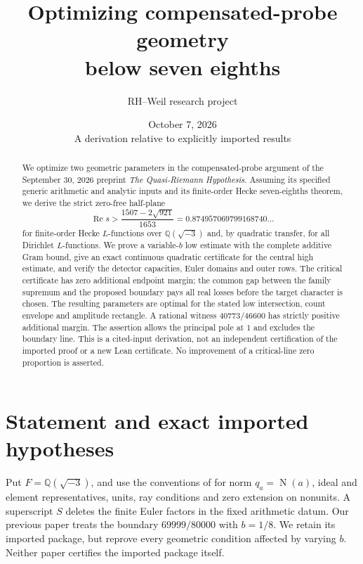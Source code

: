 \documentclass[11pt,a4paper]{article}
\title{Optimizing compensated-probe geometry\\below seven eighths}
\author{RH--Weil research project}
\date{October 7, 2026\\[3pt]\small A derivation relative to explicitly imported results}
\theoremstyle{definition}
\newcommand{\Rea}{\operatorname{Re}}
\newcommand{\N}{\operatorname{N}}
\begin{document}
\maketitle
\begin{abstract}
We optimize two geometric parameters in the compensated-probe argument
of the September 30, 2026 preprint \emph{The Quasi-Riemann Hypothesis}.
Assuming its specified generic arithmetic and analytic inputs and its
finite-order Hecke seven-eighths theorem, we derive the strict zero-free
half-plane
\[
 \Rea s>\frac{1507-2\sqrt{921}}{1653}
       =0.874957069799168740\ldots
\]
for finite-order Hecke $L$-functions over $\mathbb Q(\sqrt{-3})$
and, by quadratic transfer, for all Dirichlet $L$-functions.
We prove a variable-$b$ low estimate with the complete additive Gram
bound, give an exact continuous quadratic certificate for the central
high estimate, and verify the detector capacities, Euler domains and
outer rows. The critical certificate has zero additional endpoint
margin; the common gap between the family supremum and the proposed
boundary pays all real losses before the target character is chosen.
The resulting parameters are optimal for the stated low intersection,
count envelope and amplitude rectangle. A rational witness
$40773/46600$ has strictly positive additional margin.
The assertion allows the principal pole at $1$ and excludes the boundary
line. This is a cited-input derivation, not an independent certification
of the imported proof or a new Lean certificate. No improvement of a
critical-line zero proportion is asserted.
\end{abstract}
\tableofcontents

\section{Statement and exact imported hypotheses}
\label{sec:inputs}
Put $F=\mathbb Q(\sqrt{-3})$, and use the conventions of \cite{OAI}
for norm $q_a=\N(a)$, ideal and element representatives, units, ray
conditions and zero extension on nonunits. A superscript $S$ deletes
the finite Euler factors in the fixed arithmetic datum.
Our previous paper \cite{Previous} treats the boundary $69999/80000$
with $b=1/8$. We retain its imported package, but reprove every
geometric condition affected by varying $b$. Neither paper certifies
the imported package itself.
\end{document}
